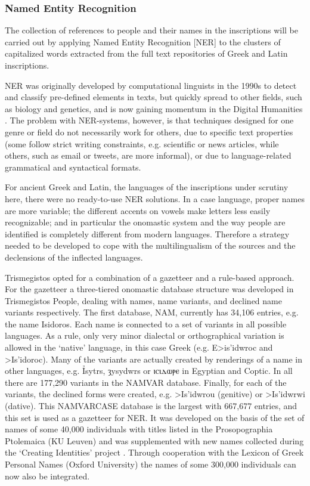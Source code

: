 \documentclass[amsthm,ebook]{saparticle}
\begin{document}
\subsubsection{Named Entity Recognition}


\noindent The collection of references to people and their names in the inscriptions will be carried out by applying Named Entity
Recognition [NER] to the clusters of capitalized words extracted from the full text repositories of Greek and Latin
inscriptions.

NER was originally developed by computational linguists in the 1990s to detect and classify pre-defined elements in
texts, but quickly spread to other fields, such as biology and genetics, and is now gaining momentum in the Digital
Humanities \citep{vanHooland}. The problem with NER-systems, however, is that techniques designed for one
genre or field do not necessarily work for others, due to specific text properties (some follow strict writing
constraints, e.g. scientific or news articles, while others, such as email or tweets, are more informal), or due to
language-related grammatical and syntactical formats.

For ancient Greek and Latin, the languages of the inscriptions under scrutiny here, there were no ready-to-use NER
solutions. In a case language, proper names are more variable; the different accents on vowels make letters less easily
recognizable; and in particular the onomastic system and the way people are identified is completely different from
modern languages. Therefore a strategy needed to be developed to cope with the multilingualism of the sources and the
declensions of the inflected languages. 

Trismegistos opted for a combination of a gazetteer and a rule-based approach. For the gazetteer a three-tiered
onomastic database structure was developed in Trismegistos People, dealing with names, name variants, and declined name
variants respectively. The first database, NAM, currently has 34,106 entries, e.g. the name Isidoros. Each name is
connected to a set of variants in all possible languages. As a rule, only very minor dialectal or orthographical
variation is allowed in the `native' language, in this case Greek (e.g. \textgreek{E>is'idwroc }and
\textgreek{>Is'idoroc). }Many of the variants are actually created by renderings of a name in other languages, e.g.
Ỉsytrs, ȝysydwrs or ⲓⲥⲓⲇⲱⲣⲉ in Egyptian and Coptic. In all there
are 177,290 variants in the NAMVAR database. Finally, for each of the variants, the declined forms were created, e.g.
\textgreek{>Is'idwrou (}genitive) or \textgreek{>Is'idwrwi (}dative). This NAMVARCASE database is the largest with
667,677 entries, and this set is used as a gazetteer for NER. It was developed on the basis of the set of names of some
40,000 individuals with titles listed in the Prosopographia Ptolemaica (KU Leuven) and was supplemented with new names
collected during the `Creating Identities' project \citep{Depauw2009}. Through cooperation with the Lexicon of
Greek Personal Names (Oxford University) the names of some 300,000 individuals can now also be integrated.
\end{document}
